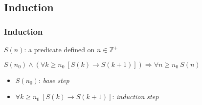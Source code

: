 \documentclass[dvipsnames]{beamer}
\begin{document}
%

\subsection{Induction}

\begin{frame}
  \frametitle{Induction}

  \begin{definition}
    $S(n)$: a predicate defined on $n \in \mathbb{Z}^+$

    \pause
    \medskip
    $S(n_0) \wedge (\forall k \geq n_0~[S(k) \rightarrow S(k+1)])
      \Rightarrow \forall n \geq n_0~S(n)$
  \end{definition}

  \pause
  \medskip
  \begin{itemize}
    \item $S(n_0)$: \emph{base step}
    \item $\forall k \geq n_0~[S(k) \rightarrow S(k+1)]$: \emph{induction step}
  \end{itemize}
\end{frame}
\end{document}
